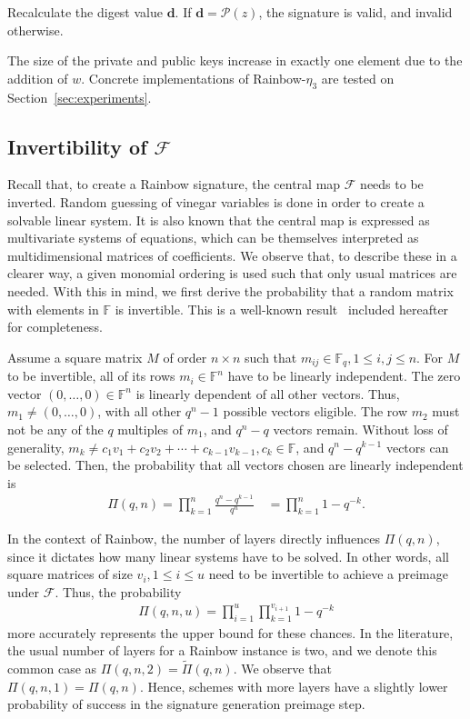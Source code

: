 \documentclass[draft, 12pt, a4paper, oneside]{memoir}
\theoremstyle{definition}
\theoremstyle{remark}
\begin{document}
Recalculate the digest value $\mathbf{d}$. If $\mathbf{d} = \mathcal{P}(z)$,
the signature is valid, and invalid otherwise.

The size of the private and public keys increase in exactly one element due to
the addition of $w$. Concrete implementations of Rainbow-$\eta_{3}$ are tested on
Section~\ref{sec:experiments}.

\subsection{Invertibility of $\mathcal{F}$}\label{subsec:invert}

Recall that, to create a Rainbow signature, the central map $\mathcal{F}$ needs
to be inverted. Random guessing of vinegar variables is done in order to create
a solvable linear system. It is also known that the central map is expressed as
multivariate systems of equations, which can be themselves interpreted as
multidimensional matrices of coefficients. We observe that, to describe these in a
clearer way, a given monomial ordering is used such that only usual matrices
are needed. With this in mind, we first derive the probability that a random
matrix with elements in $\mathbb{F}$ is invertible. This is a well-known
result~\cite[Remark 13.2.14]{Mullen:2013} included hereafter for completeness.

Assume a square matrix $M$ of order $n \times n$ such that
$m_{ij} \in \mathbb{F}_{q}, 1 \leq i, j \leq n$. For $M$ to be
invertible, all of its rows
$m_{i} \in \mathbb{F}^{n}$ have to be linearly independent. The zero vector
$(0, \dots, 0) \in \mathbb{F}^{n}$ is linearly dependent of all other vectors.
Thus, $m_{1} \neq (0, \dots, 0)$, with all other $q^{n} - 1$ possible vectors
eligible. The row $m_{2}$ must not be any of the $q$ multiples of $m_{1}$, and
$q^{n} - q$ vectors remain. Without loss of generality,
$m_{k} \ne c_{1} v_{1} + c_{2} v_{2} + \cdots + c_{k - 1} v_{k - 1},
c_{k} \in \mathbb{F}$, and $q^{n} - q^{k - 1}$ vectors can be selected. Then,
the probability that all vectors chosen are linearly independent is
\begin{align}
  \Pi(q, n) = \prod_{k = 1}^{n} \frac{q^{n} - q^{k - 1}}{q^{n}} \quad
    = \prod_{k = 1}^{n} 1 - q^{-k}.
\end{align}

In the context of Rainbow, the number of layers directly influences
$\Pi(q, n)$, since it dictates how many linear systems have to be solved. In
other words, all square matrices of size $v_{i}, 1 \leq i \leq u$ need to
be invertible to achieve a preimage under $\mathcal{F}$. Thus, the probability
\begin{align}
  \Pi(q, n, u) = \prod_{i = 1}^{u} \prod_{k = 1}^{v_{i + 1}} 1 - q^{-k}
\end{align}
more accurately represents the upper bound for these chances. In the
literature, the usual number of layers for a Rainbow instance is two, and we
denote this common case as $\Pi(q, n, 2) = \widetilde{\Pi}(q, n)$. We observe
that $\Pi(q, n, 1) = \Pi(q, n)$. Hence, schemes with more layers have a
slightly lower probability of success in the signature generation preimage
step.
\end{document}
